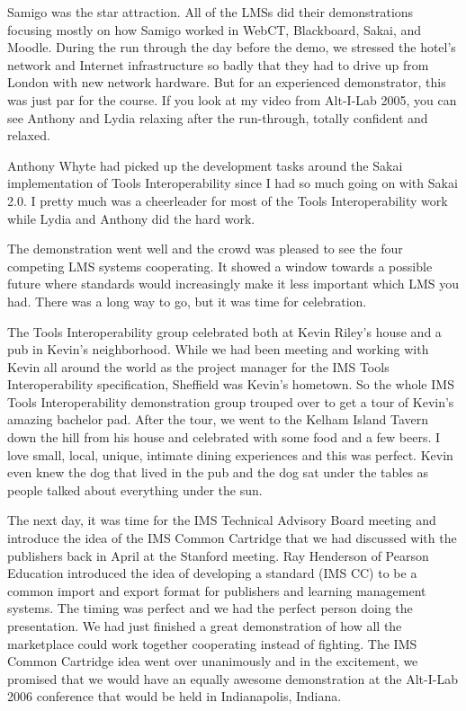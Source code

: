 \documentclass[12pt]{book}
\begin{document}
Samigo was the star attraction.  All of the LMSs
did their demonstrations focusing mostly on how
Samigo worked in WebCT, Blackboard, Sakai, and Moodle.
During the run through the day before the demo, we stressed the
hotel's network and Internet infrastructure so badly that they
had to drive up from London with new network hardware.  But for
an experienced demonstrator, this was just par for the course.
If you look at my video from Alt-I-Lab 2005, you can see Anthony
and Lydia relaxing after the run-through, totally confident
and relaxed.

Anthony Whyte had picked up the development tasks around the Sakai
implementation of Tools Interoperability since I had so much
going on with Sakai 2.0.  I pretty much was a cheerleader for
most of the Tools Interoperability work while Lydia and Anthony
did the hard work.

The demonstration went well and the crowd was pleased
to see the four competing LMS systems cooperating. It showed
a window towards a possible future where standards would
increasingly make it less important which LMS you had.  There
was a long way to go, but it was time for celebration.

The Tools Interoperability group celebrated both
at Kevin Riley's house and a pub in Kevin's
neighborhood.   While we had been meeting and working with Kevin
all around the world as the project manager for the IMS Tools
Interoperability specification, Sheffield was Kevin's hometown.  So
the whole IMS Tools Interoperability demonstration group
trouped over to get a tour of Kevin's amazing bachelor pad.
After the tour, we went to the Kelham Island Tavern
down the hill from his house
and celebrated with some food and a few beers.  I love small,
local, unique, intimate dining experiences and this was perfect.
Kevin even knew the dog that lived in the pub and the dog sat under
the tables as people talked about everything under the sun.

The next day, it was time for the IMS Technical
Advisory Board meeting and introduce the idea of the
IMS Common Cartridge that we had discussed with the publishers
back in April at the Stanford meeting.  Ray Henderson
of Pearson Education introduced the idea of developing a standard (IMS CC) 
to be a common import and
export format for publishers and learning management systems.
The timing was perfect and we had the perfect person doing the
presentation.  We had just finished a great demonstration
of how all the marketplace could work together cooperating
instead of fighting.  The IMS Common Cartridge idea
went over unanimously and in the excitement, we promised
that we would have an equally awesome demonstration at
the Alt-I-Lab 2006 conference that would be held
in Indianapolis, Indiana.
\end{document}
